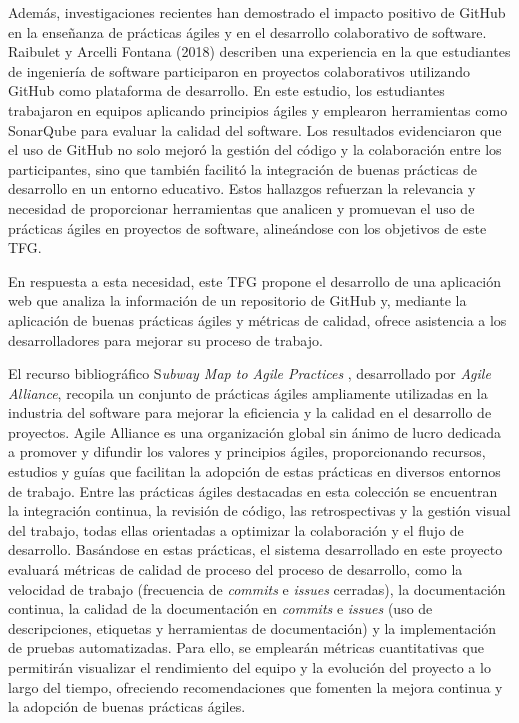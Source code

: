 Además, investigaciones recientes han demostrado el impacto positivo de GitHub en la enseñanza de prácticas ágiles y en el desarrollo colaborativo de software. Raibulet y Arcelli Fontana (2018) \cite{raibulet2018409} describen una experiencia en la que estudiantes de ingeniería de software participaron en proyectos colaborativos utilizando GitHub como plataforma de desarrollo. En este estudio, los estudiantes trabajaron en equipos aplicando principios ágiles y emplearon herramientas como SonarQube para evaluar la calidad del software. Los resultados evidenciaron que el uso de GitHub no solo mejoró la gestión del código y la colaboración entre los participantes, sino que también facilitó la integración de buenas prácticas de desarrollo en un entorno educativo. Estos hallazgos refuerzan la relevancia y necesidad de proporcionar herramientas que analicen y promuevan el uso de prácticas ágiles en proyectos de software, alineándose con los objetivos de este TFG.

En respuesta a esta necesidad, este TFG propone el desarrollo de una aplicación web que analiza la información de un repositorio de GitHub y, mediante la aplicación de buenas prácticas ágiles y métricas de calidad, ofrece asistencia a los desarrolladores para mejorar su proceso de trabajo.

El recurso bibliográfico S\textit{ubway Map to Agile Practices} \cite{agileSubwayMap}, desarrollado por \textit{Agile Alliance}, recopila un conjunto de prácticas ágiles ampliamente utilizadas en la industria del software para mejorar la eficiencia y la calidad en el desarrollo de proyectos. Agile Alliance es una organización global sin ánimo de lucro dedicada a promover y difundir los valores y principios ágiles, proporcionando recursos, estudios y guías que facilitan la adopción de estas prácticas en diversos entornos de trabajo. Entre las prácticas ágiles destacadas en esta colección se encuentran la integración continua, la revisión de código, las retrospectivas y la gestión visual del trabajo, todas ellas orientadas a optimizar la colaboración y el flujo de desarrollo. Basándose en estas prácticas, el sistema desarrollado en este proyecto evaluará métricas de calidad de proceso del proceso de desarrollo, como la velocidad de trabajo (frecuencia de \textit{commits} e \textit{issues} cerradas), la documentación continua, la calidad de la documentación en \textit{commits} e \textit{issues} (uso de descripciones, etiquetas y herramientas de documentación) y la implementación de pruebas automatizadas. Para ello, se emplearán métricas cuantitativas que permitirán visualizar el rendimiento del equipo y la evolución del proyecto a lo largo del tiempo, ofreciendo recomendaciones que fomenten la mejora continua y la adopción de buenas prácticas ágiles.

